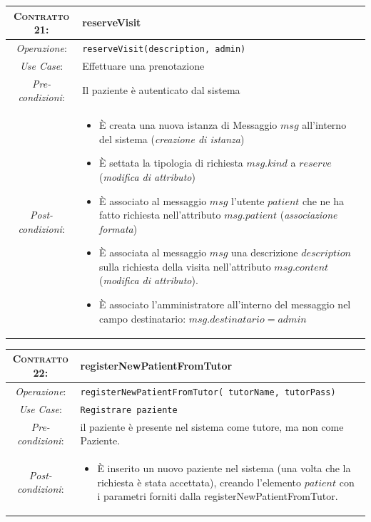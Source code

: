 \begin{tabularx}{\columnwidth}{cX}
\toprule
\textsc{Contratto 21}:& \textbf{reserveVisit}\\
\midrule
\textit{Operazione}: & 	\texttt{reserveVisit(description, admin)}\\
\textit{Use Case}: &	Effettuare una prenotazione\\
\textit{Pre-condizioni}: &  Il paziente è autenticato dal sistema\\
\textit{Post-condizioni}: & \begin{itemize}
\item È creata una nuova istanza di Messaggio $msg$ all'interno del sistema
	(\textit{creazione di istanza})
\item È settata la tipologia di richiesta $msg.kind$ a $reserve$ (\textit{modifica di
	attributo})
\item È associato al messaggio $msg$ l'utente $patient$ che ne ha fatto richiesta
	nell'attributo $msg.patient$ (\textit{associazione formata})
\item È associata al messaggio $msg$ una descrizione $description$ sulla richiesta 
	della visita nell'attributo $msg.content$ (\textit{modifica di attributo}).
\item È associato l'amministratore all'interno del messaggio nel campo destinatario:
	$msg.destinatario = admin$
\end{itemize}\\
\bottomrule
\end{tabularx}
\medskip

\begin{tabularx}{\columnwidth}{cX}
\toprule
\textsc{Contratto 22}:&	\textbf{registerNewPatientFromTutor}\\
\midrule
\textit{Operazione}: & 	\texttt{registerNewPatientFromTutor( tutorName, tutorPass)}\\
\textit{Use Case}: &	\texttt{Registrare paziente}\\
\textit{Pre-condizioni}: &
il paziente è presente nel sistema come tutore, ma non come Paziente.\\
\textit{Post-condizioni}: & \begin{itemize}
\item È inserito un nuovo paziente nel sistema (una volta che la richiesta è
	stata accettata), creando l'elemento $patient$ con i parametri forniti 
	dalla registerNewPatientFromTutor.
\end{itemize}\\
\bottomrule
\end{tabularx}
\medskip

